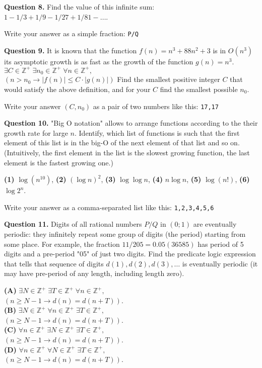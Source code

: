 \documentclass[jou]{apa6}
\begin{document}
\vspace{6pt}
{\bf Question 8.} Find the value of this infinite sum:
$1 - 1/3 + 1/9 - 1/27 + 1/81 - \ldots$. 

Write your answer as a simple fraction: {\tt P/Q}


\vspace{6pt}
{\bf Question 9.} It is known that the function $f(n) = n^3 +88n^2 +3$ is in $O(n^3)$ \textendash{}
its asymptotic growth is as fast as the growth of the function $g(n) = n^3$. 
$\exists C \in \mathbb{Z}^{+}\;\exists n_0 \in \mathbb{Z}^{+}\;\forall n \in \mathbb{Z}^{+},$\\
$(n > n_0 \rightarrow |f(n)| \leq C\cdot{}|g(n)|)$
Find the smallest positive integer $C$ that would satisfy the above definition, 
and for your $C$ find the smallest possible $n_0$.

Write your answer $(C,n_0)$ as a pair of two numbers like this: {\tt 17,17}


\vspace{6pt}
{\bf Question 10.}
"Big O notation" allows to arrange functions according to the their
growth rate for large $n$. 
Identify, which list of functions is such that 
the first element of this list is in the big-O of the 
next element of that list and so on. (Intuitively, the first element
in the list is the slowest growing function, the last element is the
fastest growing one.)

{\bf (1)} $\log (n^{10})$, {\bf (2)} $(\log n)^2$, {\bf (3)} $\log \log n$,
{\bf (4)} $n\log n$, {\bf (5)} $\log(n!)$, {\bf (6)} $\log 2^n$.

Write your answer as a comma-separated list like this: {\tt 1,2,3,4,5,6}


\vspace{6pt}
{\bf Question 11.} Digits of all rational numbers $P/Q$ in $(0;1)$
are eventually periodic: they infinitely repeat some group of digits (the period)
starting from some place. For example,
the fraction $11/205 = 0.05(36585)$ has period of 5 digits and a pre-period "05"
of just two digits.
Find the predicate logic expression that tells
that sequence of digits $d(1),d(2),d(3),\ldots$ is eventually periodic (it may have
pre-period of any length, including length zero).

\noindent
{\bf (A)} $\exists N \in \mathbb{Z}^{+}\;\exists T \in \mathbb{Z}^{+}\;\forall n \in \mathbb{Z}^{+},$\\
$\left(n \geq N - 1 \rightarrow d(n) = d(n+T)\right)$.\\
{\bf (B)} $\exists N \in \mathbb{Z}^{+}\;\forall n \in \mathbb{Z}^{+}\;\exists T \in \mathbb{Z}^{+},$\\
$\left(n \geq N - 1 \rightarrow d(n) = d(n+T)\right)$.\\
{\bf (C)} $\forall n \in \mathbb{Z}^{+}\;\exists N \in \mathbb{Z}^{+}\;\exists T \in \mathbb{Z}^{+},$\\
$\left(n \geq N - 1 \rightarrow d(n) = d(n+T)\right)$.\\
{\bf (D)} $\forall n \in \mathbb{Z}^{+}\;\forall N \in \mathbb{Z}^{+}\;\exists T \in \mathbb{Z}^{+},$\\
$\left(n \geq N - 1 \rightarrow d(n) = d(n+T)\right)$. 
\end{document}
